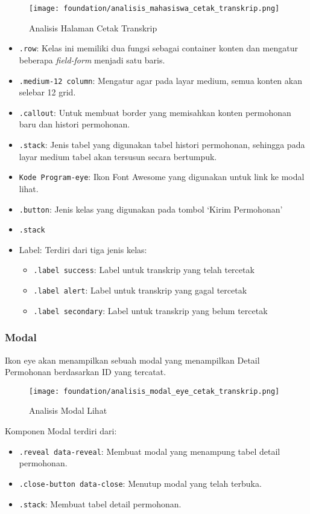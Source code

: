 \begin{figure} [H]
	\centering  
	\texttt{[image: foundation/analisis\_mahasiswa\_cetak\_transkrip.png]}
	\caption{Analisis Halaman Cetak Transkrip} 
\end{figure}
\begin{itemize}
	\item \texttt{.row}: Kelas ini memiliki dua fungsi sebagai container konten dan mengatur beberapa \textit{field-form} menjadi satu baris. 
	\item \texttt{.medium-12 column}: Mengatur agar pada layar medium, semua konten akan selebar 12 grid.
	\item \texttt{.callout}: Untuk membuat border yang memisahkan konten permohonan baru dan histori permohonan.
	\item \texttt{.stack}: Jenis tabel yang digunakan tabel histori permohonan, sehingga pada layar medium tabel akan tersusun secara bertumpuk.
	\item \texttt{Kode Program-eye}: Ikon Font Awesome yang digunakan untuk link ke modal lihat.
	\item \texttt{.button}: Jenis kelas yang digunakan pada tombol `Kirim Permohonan'
	\item \texttt{.stack}
	\item Label: Terdiri dari tiga jenis kelas:
	\begin{itemize}
		\item \texttt{.label success}: Label untuk transkrip yang telah tercetak
		\item \texttt{.label alert}: Label untuk transkrip yang gagal tercetak
		\item \texttt{.label secondary}: Label untuk transkrip yang belum tercetak
	\end{itemize}
	
\end{itemize}
\subsubsection{Modal}
Ikon eye akan menampilkan sebuah modal yang menampilkan Detail Permohonan berdasarkan ID yang tercatat.
\begin{figure} [H]
	\centering  
	\texttt{[image: foundation/analisis\_modal\_eye\_cetak\_transkrip.png]}  
	\caption{Analisis Modal Lihat} 
\end{figure}

Komponen Modal terdiri dari:
\begin{itemize}
	\item \texttt{.reveal data-reveal}: Membuat modal yang menampung tabel detail permohonan.
	\item \texttt{.close-button data-close}: Menutup modal yang telah terbuka.
	\item \texttt{.stack}:	Membuat tabel detail permohonan.
\end{itemize}
